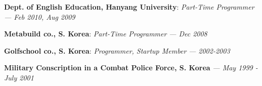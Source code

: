 {\bf Dept. of English Education, Hanyang University}: \emph{Part-Time Programmer}
{\it \footnotesize --- Feb 2010, Aug 2009}
\vspace{-0.15in}

{\bf Metabuild co., S. Korea}: \emph{Part-Time Programmer}
{\it \footnotesize --- Dec 2008}
\vspace{-0.15in}

{\bf Golfschool co., S. Korea}: \emph{Programmer, Startup Member}
{\it \footnotesize --- 2002-2003}
\vspace{-0.15in}

{\bf Military Conscription in a Combat Police Force, S. Korea}
{\it \footnotesize --- May 1999 - July 2001}

